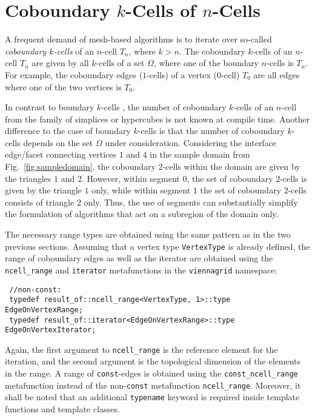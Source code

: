 \section{Coboundary $k$-Cells of $n$-Cells}
A frequent demand of mesh-based algorithms is to iterate over so-called \emph{coboundary $k$-cells} of an $n$-cell $T_n$, where $k > n$.
The coboundary $k$-cells of an $n$-cell $T_n$ are given by all $k$-cells of a set $\Omega$, where one of the boundary $n$-cells is $T_n$.
For example, the coboundary edges ($1$-cells) of a vertex ($0$-cell) $T_0$ are all edges where one of the two vertices is $T_0$.

In contrast to boundary $k$-cells , the number of coboundary $k$-cells of an $n$-cell from the family of simplices or hypercubes is not known at compile time.
Another difference to the case of boundary $k$-cells is that the number of coboundary $k$-cells depends on the set $\Omega$ under consideration.
Considering the interface edge/facet connecting vertices $1$ and $4$ in the sample domain from Fig.~\ref{fig:sampledomain}, the coboundary $2$-cells within the domain are given by the triangles $1$ and $2$.
However, within segment $0$, the set of coboundary $2$-cells is given by the triangle $1$ only, while within segment $1$ the set of coboundary $2$-cells consists of triangle $2$ only.
Thus, the use of segments can substantially simplify the formulation of algorithms that act on a subregion of the domain only.

The necessary range types are obtained using the same pattern as in the two previous sections.
Assuming that a vertex type \lstinline|VertexType| is already defined, the range of coboundary edges as well as the iterator are obtained
using the \lstinline|ncell_range| and \lstinline|iterator| metafunctions in the \lstinline|viennagrid| namespace:
\begin{lstlisting}
 //non-const:
 typedef result_of::ncell_range<VertexType, 1>::type  EdgeOnVertexRange;
 typedef result_of::iterator<EdgeOnVertexRange>::type EdgeOnVertexIterator;
\end{lstlisting}
Again, the first argument to \lstinline|ncell_range| is the reference element for the iteration, and the second argument is the topological dimension of the elements in the range.
A range of \lstinline|const|-edges is obtained using the \lstinline|const_ncell_range| metafunction instead of the non-\lstinline|const| metafunction \lstinline|ncell_range|.
Moreover, it shall be noted that an additional \lstinline|typename| keyword is required inside template functions and template classes.

